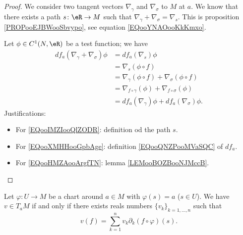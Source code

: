 \begin{proof}
    We consider two tangent vectors \( \nabla_{\gamma}\) and \( \nabla_{\sigma}\) to \( M\) at \( a\). We know that there exists a path \( s\colon \eR\to M\) such that \( \nabla_{\gamma}+\nabla_{\sigma}=\nabla_s\). This is proposition \ref{PROPooEJBWooSbvypo}, see equation \eqref{EQooYNAOooKkKmxo}.

    Let \( \phi\in C^1(N,\eR)\) be a test function; we have
    \begin{subequations}
        \begin{align}
            df_a(\nabla_{\gamma}+\nabla_{\sigma})\phi&=df_a(\nabla_s)\phi  \label{EQooIMZIooQlZODR}\\
            &=\nabla_s(\phi\circ f)     \label{EQooXMHHooGpbAge}\\
            &=\nabla_{\gamma}(\phi\circ f)+\nabla_{\sigma}(\phi\circ f)\\
            &=\nabla_{f\circ \gamma}(\phi)+\nabla_{f\circ \sigma}(\phi)     \label{EQooHMZAooArgfTN}\\
            &=df_a(\nabla_{\gamma})\phi+df_a(\nabla_{\sigma})\phi.
        \end{align}
    \end{subequations}
    Justifications:
    \begin{itemize}
        \item For \eqref{EQooIMZIooQlZODR}: definition od the path \( s\).
        \item For \eqref{EQooXMHHooGpbAge}: definition \eqref{EQooQNZPooMVaSQC} of \( df_a\).
        \item For \eqref{EQooHMZAooArgfTN}: lemma \ref{LEMooBOZBooNJMccB}.
    \end{itemize}
\end{proof}

\begin{lemma}       \label{LEMooSCVHooYPiGse}
    Let \( \varphi\colon U\to M\) be a chart around \( a\in M\) with \( \varphi(s)=a\) (\( s\in U\)). We have \( v\in T_aM\) if and only if there exists reals numbers \( \{ v_k \}_{k=1,\ldots, n}\) such that
    \begin{equation}        \label{EQooNEDSooOhyrCZ}
        v(f)=\sum_{k=1}^nv_k\partial_k(f\circ \varphi)(s).
    \end{equation}
\end{lemma}

